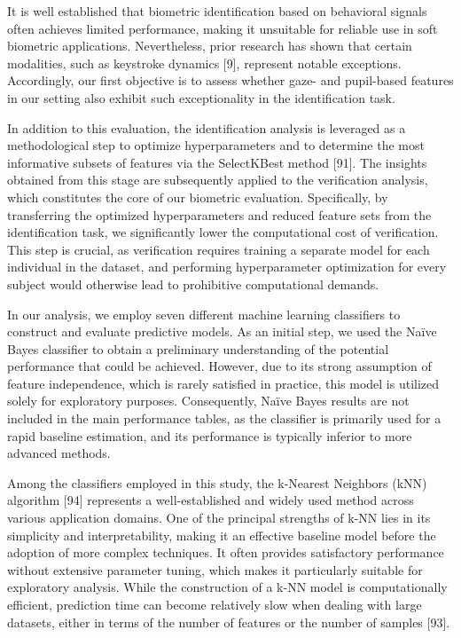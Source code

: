 \documentclass[12pt]{report}
\begin{document}
It is well established that biometric identification based on behavioral signals often achieves limited performance, making it unsuitable for reliable use in soft biometric applications. 
Nevertheless, prior research has shown that certain modalities, such as keystroke dynamics [9], represent notable exceptions. 
Accordingly, our first objective is to assess whether gaze- and pupil-based features in our setting also exhibit such exceptionality in the identification task. 

In addition to this evaluation, the identification analysis is leveraged as a methodological step to optimize hyperparameters and to determine the most informative subsets of features via the SelectKBest method [91]. 
The insights obtained from this stage are subsequently applied to the verification analysis, which constitutes the core of our biometric evaluation. 
Specifically, by transferring the optimized hyperparameters and reduced feature sets from the identification task, we significantly lower the computational cost of verification. 
This step is crucial, as verification requires training a separate model for each individual in the dataset, and performing hyperparameter optimization for every subject would otherwise lead to prohibitive computational demands.

In our analysis, we employ seven different machine learning classifiers to construct and evaluate predictive models.
As an initial step, we used the Naïve Bayes classifier to obtain a preliminary understanding of the potential performance that could be achieved.
However, due to its strong assumption of feature independence, which is rarely satisfied in practice, this model is utilized solely for exploratory purposes.
Consequently, Naïve Bayes results are not included in the main performance tables, as the classifier is primarily used for a rapid baseline estimation, and its performance is typically inferior to more advanced methods.

Among the classifiers employed in this study, the k-Nearest Neighbors (kNN) algorithm [94] represents a well-established and widely used method across various application domains.
One of the principal strengths of k-NN lies in its simplicity and interpretability, making it an effective baseline model before the adoption of more complex techniques.
It often provides satisfactory performance without extensive parameter tuning, which makes it particularly suitable for exploratory analysis.
While the construction of a k-NN model is computationally efficient, prediction time can become relatively slow when dealing with large datasets, either in terms of the number of features or the number of samples [93].
\end{document}
